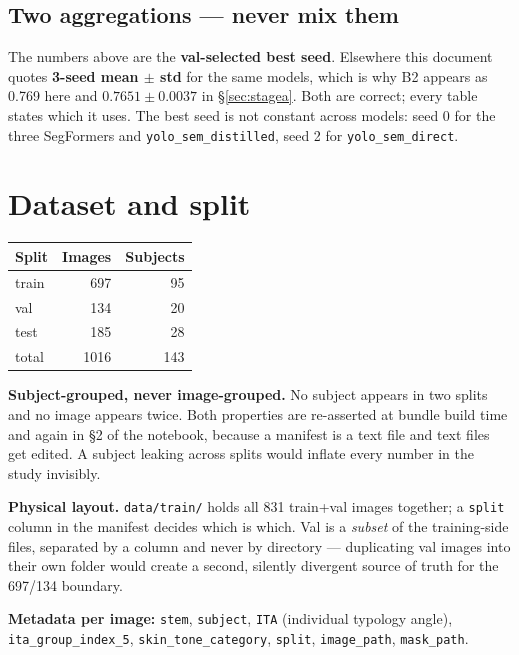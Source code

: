 \documentclass[11pt]{article}
\begin{document}
\subsection{Two aggregations --- never mix them}

The numbers above are the \textbf{val-selected best seed}. Elsewhere this
document quotes \textbf{3-seed mean $\pm$ std} for the same models, which is why
B2 appears as 0.769 here and $0.7651\pm0.0037$ in \S\ref{sec:stagea}. Both are
correct; every table states which it uses. The best seed is not constant across
models: seed 0 for the three SegFormers and \texttt{yolo\_sem\_distilled},
seed 2 for \texttt{yolo\_sem\_direct}.

\section{Dataset and split}

\begin{center}
\begin{tabular}{lnn}
\toprule
\textbf{Split} & \textbf{Images} & \textbf{Subjects} \\
\midrule
train & 697 & 95 \\
val & 134 & 20 \\
test & 185 & 28 \\
\midrule
total & 1016 & 143 \\
\bottomrule
\end{tabular}
\end{center}

\textbf{Subject-grouped, never image-grouped.} No subject appears in two splits
and no image appears twice. Both properties are re-asserted at bundle build time
and again in \S2 of the notebook, because a manifest is a text file and text
files get edited. A subject leaking across splits would inflate every number in
the study invisibly.

\textbf{Physical layout.} \texttt{data/train/} holds all 831 train+val images
together; a \texttt{split} column in the manifest decides which is which. Val is
a \emph{subset} of the training-side files, separated by a column and never by
directory --- duplicating val images into their own folder would create a second,
silently divergent source of truth for the 697/134 boundary.

\textbf{Metadata per image:} \texttt{stem}, \texttt{subject}, \texttt{ITA}
(individual typology angle), \texttt{ita\_group\_index\_5},
\texttt{skin\_tone\_category}, \texttt{split}, \texttt{image\_path},
\texttt{mask\_path}.
\end{document}
